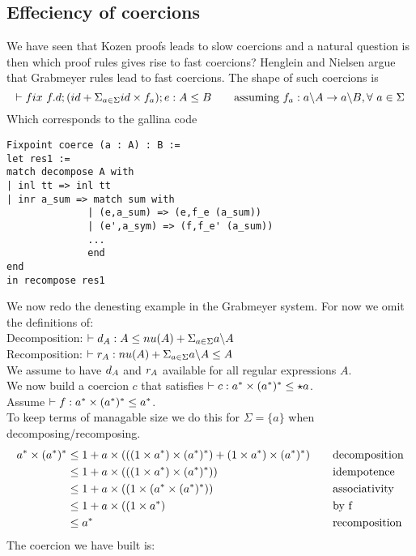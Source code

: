 \documentclass[a4paper,UKenglish,cleveref, autoref, thm-restate]{lipics-v2021}
\begin{document}
\subsection{Effeciency of coercions}
We have seen that Kozen proofs leads to slow coercions and a natural question is then which proof rules gives rise to fast coercions? Henglein and Nielsen argue that Grabmeyer rules lead to fast coercions. The shape of such coercions is
\[
\contains{}{\fix ~f.d;(id + \Sigma_{a \in \Sigma} id\times f_a); e}{A}{B} \qquad \text{assuming }f_a : \derive{a}{A} \rightarrow \derive{a}{B}, \forall ~ a \in \Sigma \]
Which corresponds to the gallina code
\begin{verbatim}
Fixpoint coerce (a : A) : B := 
let res1 := 
match decompose A with 
| inl tt => inl tt
| inr a_sum => match sum with 
              | (e,a_sum) => (e,f_e (a_sum))
              | (e',a_sym) => (f,f_e' (a_sum))
              ...
              end 
end 
in recompose res1
\end{verbatim}
We now redo the denesting example in the Grabmeyer system. For now we omit the definitions of:\\
Decomposition: $\contains{}{d_A}{A}{\mynu{A} + \Sigma_{a \in \Sigma} \derive{a}{A}}$\\
Recomposition: $\contains{}{r_A}{\mynu{A} + \Sigma_{a \in \Sigma} \derive{a}{A}}{A}$\\
We assume to have $\dslcomm{d_A}$ and $\dslcomm{r_A}$ available for all regular expressions $A$.\\
We now build a coercion $c$ that satisfies $\contains{}{c}{a^* \times \dstar a}{\star a}$.\\
Assume $\contains{}{f}{a^* \times \dstar a}{a^*}$.\\
To keep terms of managable size we do this for $\Sigma = \{a\}$ when decomposing/recomposing.
\begin{align}
a^*\times ({a^*})^* &\leq 1 + a \times (((1 \times a^*) \times ({a^*})^*) + (1 \times a^*) \times ({a^*})^*) &&\quad \text{decomposition}\\
& \leq 1 + a \times (((1 \times a^*) \times ({a^*})^*)) &&\quad \text{idempotence}\\
&\leq 1 + a \times ((1 \times (a^* \times ({a^*})^*)) &&\quad \text{associativity}\\
& \leq 1 + a \times ((1 \times a^*) &&\quad \text{by f}\\
& \leq a^* && \quad \text{recomposition}
\end{align}
The coercion we have built is:\\
\end{document}
